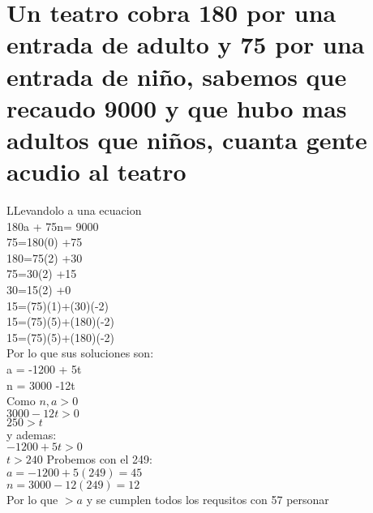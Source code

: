 \section{Un teatro cobra 180 por una entrada de adulto y 75 por una entrada de niño, sabemos que recaudo 9000 y que hubo mas adultos que niños, cuanta gente acudio al teatro}
LLevandolo a una ecuacion\\
180a + 75n= 9000\\
75=180(0)  +75\\
180=75(2)  +30\\
75=30(2)  +15\\
30=15(2)  +0\\
15=(75)(1)+(30)(-2)\\
15=(75)(5)+(180)(-2)\\
15=(75)(5)+(180)(-2)\\
Por lo que sus soluciones son:\\
a = -1200 + 5t \\
n = 3000 -12t \\
Como $n,a > 0$ \\
$3000-12t > 0$ \\
$250> t$ \\
y ademas: \\
$-1200+5t > 0$ \\
$t>240$
Probemos con el 249: \\
$a = -1200+5(249)= 45$\\
$n = 3000-12(249) = 12$\\
Por lo que $> a$ y se cumplen todos los requsitos con 57 personar